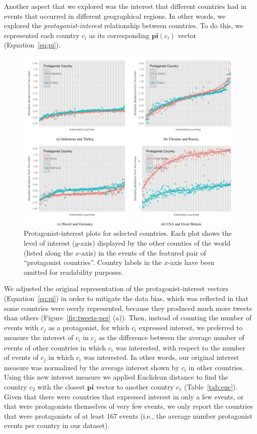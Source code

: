 
Another aspect that we explored was the interest that different countries had in
events that occurred in different geographical regions. 
%
In other words, we explored the \emph{protagonist-interest} relationship between
countries. 
%
To do this, we represented each country $c_i$ as its corresponding
$\mathbf{pi}(c_i)$ vector (Equation~\ref{eq:pi}).


\begin{figure}[t]
\centering
\includegraphics[width=\textwidth]{figures/geopolitical/int_prot.pdf}
\caption[Protagonist-interest plots for selected
countries.]{Protagonist-interest plots for selected countries.  Each plot shows
the level of interest ($y$-axis) displayed by the other counties of the world
(listed along the $x$-axis) in the events of the featured pair of ``protagonist
countries''. Country labels in the $x$-axis have been omitted for readability
purposes.}
\label{fig:int-prot}
\end{figure}

We adjusted the original representation of the protagonist-interest vectors
(Equation~\ref{eq:pi}) in order to mitigate the data bias, which was reflected
in that some countries were overly represented, because they produced much more
tweets than others (Figure~\ref{fig:tweets-per} (a)). 
%
Then, instead of counting the number of events with $c_j$ as a protagonist, for
which $c_i$ expressed interest, we preferred to measure the interest of $c_i$ in
$c_j$ as the difference between the average number of events of other countries
in which $c_i$ was interested, with respect to the number of events of $c_j$ in
which $c_i$ was interested. 
%
In other words, our original interest measure was normalized by the average
interest shown by $c_i$ in other countries. 
%
Using this new interest measure we applied Euclidean distance to find the
country $c_2$ with the closest $\mathbf{pi}$ vector to another country $c_1$
(Table~\ref{tab:euc}).
%
Given that there were countries that expressed interest in only a few events, or
that were protagonists themselves of very few events, we only report the
countries that were protagonists of at least 167 events (i.e., the average
number protagonist events per country in our dataset).

